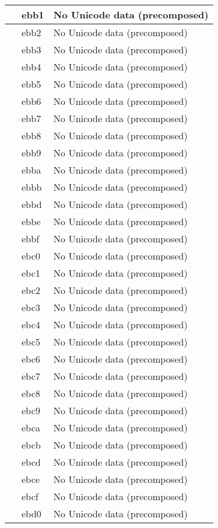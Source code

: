 \documentclass[12pt,letterpaper,openany]{book}
\begin{document}
\begin{center}
\begin{supertabular}{|m{0.25in}|m{0.5in}|m{4in}|}
 & ebb1 & No Unicode data (precomposed)\\\hline
 & ebb2 & No Unicode data (precomposed)\\\hline
 & ebb3 & No Unicode data (precomposed)\\\hline
 & ebb4 & No Unicode data (precomposed)\\\hline
 & ebb5 & No Unicode data (precomposed)\\\hline
 & ebb6 & No Unicode data (precomposed)\\\hline
 & ebb7 & No Unicode data (precomposed)\\\hline
 & ebb8 & No Unicode data (precomposed)\\\hline
 & ebb9 & No Unicode data (precomposed)\\\hline
 & ebba & No Unicode data (precomposed)\\\hline
 & ebbb & No Unicode data (precomposed)\\\hline
 & ebbd & No Unicode data (precomposed)\\\hline
 & ebbe & No Unicode data (precomposed)\\\hline
 & ebbf & No Unicode data (precomposed)\\\hline
 & ebc0 & No Unicode data (precomposed)\\\hline
 & ebc1 & No Unicode data (precomposed)\\\hline
 & ebc2 & No Unicode data (precomposed)\\\hline
 & ebc3 & No Unicode data (precomposed)\\\hline
 & ebc4 & No Unicode data (precomposed)\\\hline
 & ebc5 & No Unicode data (precomposed)\\\hline
 & ebc6 & No Unicode data (precomposed)\\\hline
 & ebc7 & No Unicode data (precomposed)\\\hline
 & ebc8 & No Unicode data (precomposed)\\\hline
 & ebc9 & No Unicode data (precomposed)\\\hline
 & ebca & No Unicode data (precomposed)\\\hline
 & ebcb & No Unicode data (precomposed)\\\hline
 & ebcd & No Unicode data (precomposed)\\\hline
 & ebce & No Unicode data (precomposed)\\\hline
 & ebcf & No Unicode data (precomposed)\\\hline
 & ebd0 & No Unicode data (precomposed)\\\hline

\end{supertabular}
\end{center}
\end{document}
